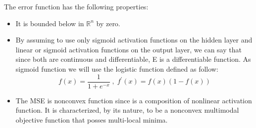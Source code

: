 \documentclass[11pt]{article}
\begin{document}
The error function has the following properties:
\begin{itemize}
    \item It is bounded below in $\mathbb{R}^n$ by zero.
    \item By assuming to use only sigmoid activation functions on the hidden layer and linear or sigmoid activation functions on the output layer, we can say that since both are continuous and differentiable, E is a differentiable function. As sigmoid function we will use the logistic function defined as follow:
    $$ f(x) = \frac{1}{1+e^{-x}} \;,\; f^{'}(x) = f(x)(1 - f(x))$$
    \item The MSE is nonconvex function since is a composition of nonlinear activation function. It is characterized, by its nature, to be a nonconvex multimodal objective function that posses multi-local minima.
\end{itemize}
\end{document}
